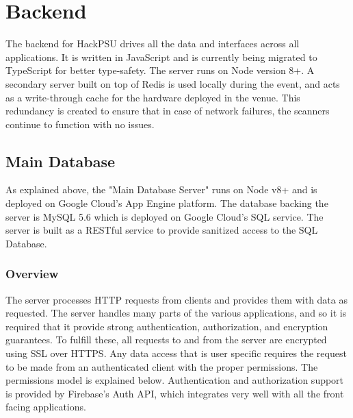 \documentclass[twoside, 12pt]{article}
\begin{document}
\newpage
\section{Backend} \label{section:api}
\par The backend for HackPSU drives all the data and interfaces across all applications. It is written in JavaScript and is currently being migrated to TypeScript for better type-safety. The server runs on Node version 8+. A secondary server built on top of Redis is  used locally during the event, and acts as a write-through cache for the hardware deployed in the venue. This redundancy is created to ensure that in case of network failures, the scanners continue to function with no issues.
\subsection{Main Database} \label{section:database}
\par As explained above, the "Main Database Server" runs on Node v8+ and is deployed on Google Cloud's App Engine platform. The database backing the server is MySQL 5.6 which is deployed on Google Cloud's SQL service. The server is built as a RESTful service to provide sanitized access to the SQL Database.
\subsubsection{Overview}
\par The server processes HTTP requests from clients and provides them with data as requested. The server handles many parts of the various applications, and so it is required that it provide strong authentication, authorization, and encryption guarantees. To fulfill these, all requests to and from the server are encrypted using SSL over HTTPS. Any data access that is user specific requires the request to be made from an authenticated client with the proper permissions. The permissions model is explained below. Authentication and authorization support is provided by Firebase's Auth API, which integrates very well with all the front facing applications.
\end{document}
